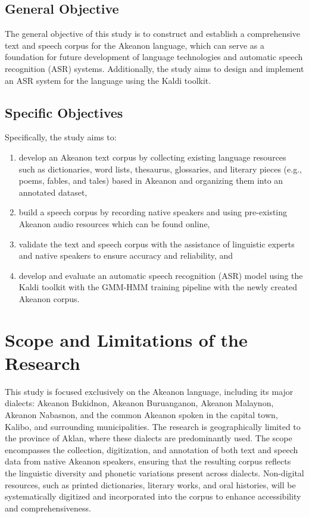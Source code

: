 \subsection{General Objective}
\label{sec:generalobjective}

The general objective of this study is to construct and establish a comprehensive text and speech corpus for the Akeanon language, which can serve as a foundation for future development of language technologies and automatic speech recognition (ASR) systems. Additionally, the study aims to design and implement an ASR system for the language using the Kaldi toolkit.

\subsection{Specific Objectives}
\label{sec:specificobjectives}

Specifically, the study aims to:
\begin{enumerate}
    \item develop an Akeanon text corpus by collecting existing language resources such as dictionaries, word lists, thesaurus, glossaries, and literary pieces (e.g., poems, fables, and tales) based in Akeanon and organizing them into an annotated dataset,
    \item build a speech corpus by recording native speakers and using pre-existing Akeanon audio resources which can be found online,
    \item validate the text and speech corpus with the assistance of linguistic experts and native speakers to ensure accuracy and reliability, and
    \item develop and evaluate an automatic speech recognition (ASR) model using the Kaldi toolkit with the GMM-HMM training pipeline with the newly created Akeanon corpus.
 \end{enumerate}
 
\section{Scope and Limitations of the Research}
\label{sec:scopelimitations}

This study is focused exclusively on the Akeanon language, including its major dialects: Akeanon Bukidnon, Akeanon Buruanganon, Akeanon Malaynon, Akeanon Nabasnon, and the common Akeanon spoken in the capital town, Kalibo, and surrounding municipalities. The research is geographically limited to the province of Aklan, where these dialects are predominantly used. The scope encompasses the collection, digitization, and annotation of both text and speech data from native Akeanon speakers, ensuring that the resulting corpus reflects the linguistic diversity and phonetic variations present across dialects. Non-digital resources, such as printed dictionaries, literary works, and oral histories, will be systematically digitized and incorporated into the corpus to enhance accessibility and comprehensiveness.


